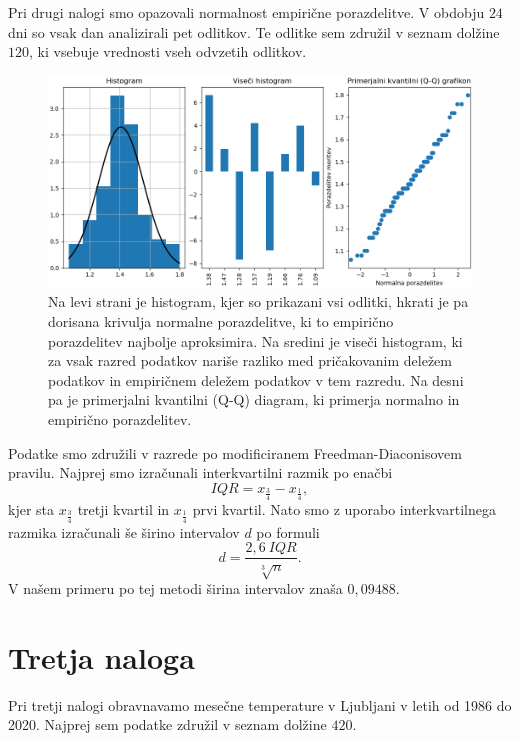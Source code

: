 \documentclass{article}
\begin{document}
Pri drugi nalogi smo opazovali normalnost empirične porazdelitve. V obdobju $24$
dni so vsak dan analizirali pet odlitkov. Te odlitke sem združil v 
seznam dolžine $120$, ki vsebuje vrednosti vseh odvzetih odlitkov.

\begin{figure}[H]
    \centering
    \includegraphics[scale=0.45]{2.png}
    \caption{Na levi strani je histogram, kjer so prikazani vsi odlitki, hkrati
    je pa dorisana krivulja normalne porazdelitve, ki to empirično porazdelitev
    najbolje aproksimira. Na sredini je viseči histogram, ki za vsak razred
    podatkov nariše razliko med pričakovanim deležem podatkov in empiričnem
    deležem podatkov v tem razredu. Na desni pa je primerjalni kvantilni (Q-Q)
    diagram, ki primerja normalno in empirično porazdelitev.}
    \label{slika 2}
\end{figure}

Podatke smo združili v razrede po modificiranem Freedman-Diaconisovem pravilu.
Najprej smo izračunali interkvartilni razmik po enačbi
\begin{equation*}
    IQR = x_\frac{3}{4} - x_\frac{1}{4},
\end{equation*}
kjer sta $x_\frac{3}{4}$ tretji kvartil in $x_\frac{1}{4}$ prvi kvartil. Nato
smo z uporabo interkvartilnega razmika izračunali še širino intervalov $d$ po
formuli
\begin{equation*}
    d = \frac{2{,}6\ IQR}{\sqrt[3]{n}}.
\end{equation*}
V našem primeru po tej metodi širina intervalov znaša $0{,}09488$.

\section{Tretja naloga}

Pri tretji nalogi obravnavamo mesečne temperature v Ljubljani v letih od 1986 do
2020. Najprej sem podatke združil v seznam dolžine $420$.
\end{document}

